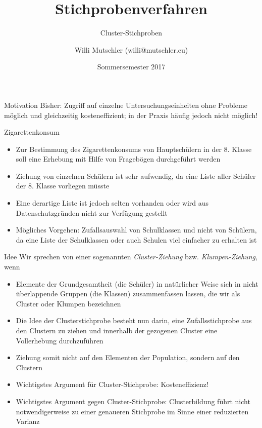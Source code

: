 \documentclass[9pt]{beamer}
\title{Stichprobenverfahren}
\subtitle{Cluster-Stichproben}
\date[SS2017]{Sommersemester 2017}
\author{Willi Mutschler (willi@mutschler.eu)}
\begin{document}
\maketitle

\begin{frame}{Motivation}
Bisher: Zugriff auf einzelne Untersuchungseinheiten ohne Probleme möglich und
gleichzeitig kosteneffizient; in der Praxis häufig jedoch nicht möglich!
\begin{block}{Zigarettenkonsum}
	\begin{itemize}
	\item Zur Bestimmung des Zigarettenkonsums von Hauptschülern in
	der 8. Klasse soll eine Erhebung mit Hilfe von Fragebögen durchgeführt werden
	\item Ziehung von einzelnen Schülern ist sehr aufwendig, da eine Liste aller Schüler der 8.
	Klasse vorliegen müsste
	\item Eine derartige Liste ist jedoch selten vorhanden oder	wird aus Datenschutzgründen nicht zur Verfügung gestellt
	\item Mögliches Vorgehen: Zufallsauswahl von Schulklassen und nicht von Schülern, da eine Liste der Schulklassen
	oder auch Schulen viel einfacher zu erhalten ist
	\end{itemize}
\end{block}
\end{frame}

\begin{frame}{Idee}
Wir sprechen von einer sogenannten \textit{Cluster-Ziehung} bzw. \textit{Klumpen-Ziehung}, wenn
\begin{itemize}
	\item Elemente der Grundgesamtheit (die Schüler) in natürlicher Weise sich in nicht überlappende Gruppen (die
	Klassen) zusammenfassen lassen, die wir als Cluster oder Klumpen bezeichnen
	\item Die Idee der Clusterstichprobe besteht nun darin, eine Zufallsstichprobe aus den Clustern zu ziehen und innerhalb der gezogenen Cluster
	eine Vollerhebung durchzuführen
	\item Ziehung somit nicht auf den Elementen der Population, sondern auf den Clustern
	\item Wichtigstes Argument für Cluster-Stichprobe: Kosteneffizienz!
	\item Wichtigstes Argument gegen Cluster-Stichprobe: Clusterbildung führt nicht notwendigerweise zu einer genaueren Stichprobe im Sinne einer reduzierten Varianz
\end{itemize}
\end{frame}
\end{document}
